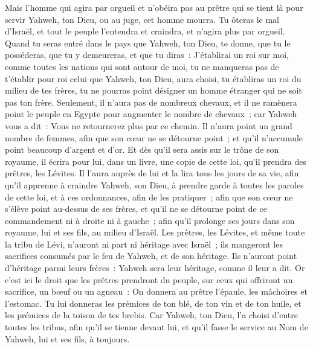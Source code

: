 \begin{multicols}{2}
Mais l'homme qui agira par orgueil et n'obéira pas au prêtre qui se tient là pour servir Yahweh, ton Dieu, ou au juge, cet homme mourra. Tu ôteras le mal d'Israël,
et tout le peuple l'entendra et craindra, et n'agira plus par orgueil.
Quand tu seras entré dans le pays que Yahweh, ton Dieu, te donne, que tu le posséderas, que tu y demeureras, et que tu diras~: J'établirai un roi sur moi, comme toutes les nations qui sont autour de moi,
tu ne manqueras pas de t'établir pour roi celui que Yahweh, ton Dieu, aura choisi, tu établiras un roi du milieu de tes frères, tu ne pourras point désigner un homme étranger qui ne soit pas ton frère.
Seulement, il n'aura pas de nombreux chevaux, et il ne ramènera point le peuple en Egypte pour augmenter le nombre de chevaux~; car Yahweh vous a dit~: Vous ne retournerez plus par ce chemin.
Il n'aura point un grand nombre de femmes, afin que son cœur ne se détourne point~; et qu'il n'accumule point beaucoup d'argent et d'or.
Et dès qu'il sera assis sur le trône de son royaume, il écrira pour lui, dans un livre, une copie de cette loi, qu'il prendra des prêtres, les Lévites.
Il l'aura auprès de lui et la lira tous les jours de sa vie, afin qu'il apprenne à craindre Yahweh, son Dieu, à prendre garde à toutes les paroles de cette loi, et à ces ordonnances, afin de les pratiquer~;
afin que son cœur ne s'élève point au-dessus de ses frères, et qu'il ne se détourne point de ce commandement ni à droite ni à gauche~; afin qu'il prolonge ses jours dans son royaume, lui et ses fils, au milieu d'Israël.
\VerseOne{}Les prêtres, les Lévites, et même toute la tribu de Lévi, n'auront ni part ni héritage avec Israël~; ils mangeront les sacrifices consumés par le feu de Yahweh, et de son héritage.
Ils n'auront point d'héritage parmi leurs frères~: Yahweh sera leur héritage, comme il leur a dit.
Or c'est ici le droit que les prêtres prendront du peuple, sur ceux qui offriront un sacrifice, un bœuf ou un agneau~: On donnera au prêtre l'épaule, les mâchoires et l'estomac.
Tu lui donneras les prémices de ton blé, de ton vin et de ton huile, et les prémices de la toison de tes brebis.
Car Yahweh, ton Dieu, l'a choisi d'entre toutes les tribus, afin qu'il se tienne devant lui, et qu'il fasse le service au Nom de Yahweh, lui et ses fils, à toujours.

\end{multicols}
